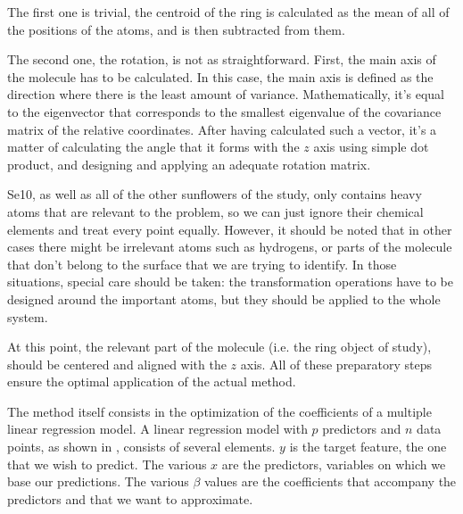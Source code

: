 The first one is trivial, the centroid of the ring is calculated as the mean of all of the positions of the atoms, and is then subtracted from them.

The second one, the rotation, is not as straightforward.
First, the main axis of the molecule has to be calculated.
In this case, the main axis is defined as the direction where there is the least amount of variance.
Mathematically, it's equal to the eigenvector that corresponds to the smallest eigenvalue of the covariance matrix of the relative coordinates.
After having calculated such a vector, it's a matter of calculating the angle that it forms with the $z$ axis using simple dot product, and designing and applying an adequate rotation matrix.

Se10, as well as all of the other sunflowers of the study, only contains heavy atoms that are relevant to the problem, so we can just ignore their chemical elements and treat every point equally.
However, it should be noted that in other cases there might be irrelevant atoms such as hydrogens, or parts of the molecule that don't belong to the surface that we are trying to identify.
In those situations, special care should be taken: the transformation operations have to be designed around the important atoms, but they should be applied to the whole system.

At this point, the relevant part of the molecule (i.e. the ring object of study), should be centered and aligned with the $z$ axis.
All of these preparatory steps ensure the optimal application of the actual method.

The method itself consists in the optimization of the coefficients of a multiple linear regression model. %
A linear regression model with $p$ predictors and $n$ data points, as shown in , consists of several elements.
$y$ is the target feature, the one that we wish to predict.
The various $x$ are the predictors, variables on which we base our predictions.
The various $\beta$ values are the coefficients that accompany the predictors and that we want to approximate.

